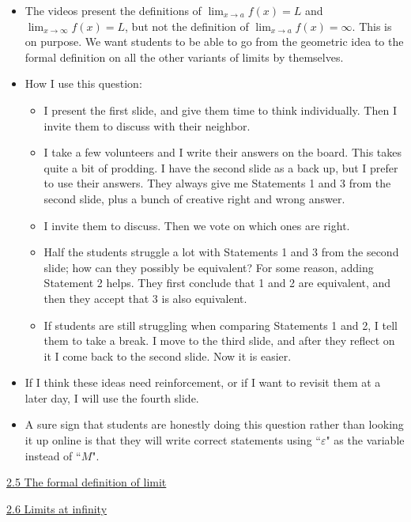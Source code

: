\documentclass[11pt]{article}
\newcommand {\DS} [1] {${\displaystyle #1}$}
\newcommand{\e}{\varepsilon}
\newcommand{\nl}{\hfill \vspace{-1.1\baselineskip}} %
\newcommand{\vv}{\hspace{8mm} \href{https://www.youtube.com/watch?v=eCBM1tVHDqo&list=PLlwePzQY_wW8P_I8BFgm0-upywEwTKd8_&index=5}{2.5 The formal definition of limit}}
\newcommand{\vvi}{\hspace{8mm} \href{https://www.youtube.com/watch?v=QNuoKYCO-mM&list=PLlwePzQY_wW8P_I8BFgm0-upywEwTKd8_&index=6}{2.6 Limits at infinity}}
\begin{document}
\begin{comments}
\nl
	\begin{itemize}
		\item  The videos present the definitions of \DS{\lim_{x \to a}f(x) = L} and \DS{\lim_{x \to \infty} f(x) = L}, but not the definition of \DS{\lim_{x \to a} f(x) = \infty}.  This is on purpose.  We want students to be able to go from the geometric idea to the formal definition on all the other variants of limits by themselves.
		\item  How I use this question:
			\begin{itemize}
				\item  I present the first slide, and give them time to think individually.  Then I invite them to discuss with their neighbor.
				\item I take a few volunteers and I write their answers on the board.  This takes quite a bit of prodding.    I have the second slide as a back up, but I prefer to use their answers.  They always give me Statements 1 and 3 from the second slide, plus a bunch of creative right and wrong answer.
				\item I invite them to discuss.  Then we vote on which ones are right.
				\item  Half the students struggle a lot with Statements 1 and 3 from the second slide; how can they possibly be equivalent?  For some reason, adding Statement 2 helps.  They first conclude that 1 and 2 are equivalent, and then they accept that 3 is also equivalent.
				\item  If students are still struggling when comparing Statements 1 and 2, I tell them to take a break.  I move to the third slide, and after they reflect on it I come back to the second slide.  Now it is easier.
			\end{itemize}
		\item If I think these ideas need reinforcement, or if I want to revisit them at a later day, I will use the fourth slide.
		\item A sure sign that students are honestly doing this question rather than looking it up online is that they will write correct statements using ``$\e$" as the variable instead of ``$M$".
	\end{itemize}
\end{comments}

\begin{videos}
\vv 

\vvi
\end{videos}
\end{document}

